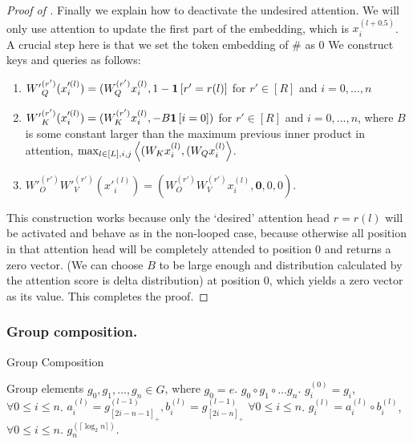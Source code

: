 \begin{proof}[Proof of ]
Finally we explain how to deactivate the undesired attention. We will only use attention to update the first part of the embedding, which is $x^{(l+0.5)}_i$. A crucial step here is that we set the token embedding of $\#$ as $0$
We construct keys and queries as follows: 
\begin{enumerate}
    \item ${W'}_Q^{(r')}(x'^{(l)}_{i}) = (W_Q^{(r')}x^{(l)}_{i}, 1- \bm{1}\left[r'=r(l)\right] $ for $r' \in [R]$ and $i=0,\ldots,n$
    \item ${W'}_K^{(r')}(x'^{(l)}_{i}) = (W_K^{(r')}x^{(l)}_{i}, -B\bm{1}\left[i=0\right]) $ for $r' \in [R]$ and $i=0,\ldots,n$, where $B$ is some constant larger than the maximum previous inner product in attention, $\max_{l\in[L],i,j} \left\langle (W_K x^{(l)}_{i},(W_Qx^{(l)}_{i} \right\rangle$. 
    \item ${W'}_O^{(r')}{W'}_V^{(r')}(x'^{(l)}_{i}) = (W_O^{(r')}W_V^{(r')}x^{(l)}_{i}, \bm{0}, 0,0)$.
\end{enumerate}
This construction works because only the `desired' attention head $r=r(l)$ will be activated and behave as in the non-looped case, because otherwise all position in that attention head will be completely attended to position $0$ and returns a zero vector. (We can choose $B$ to be large enough and distribution calculated by the attention score is delta distribution) at position $0$, which yields a zero vector as its value. This completes the proof.
\end{proof}





\subsubsection{Group composition.}
\label{sec:apx_group_composition}






\begin{algorithm}[t]
\caption{Group Composition}\label{alg:group_composition}
\begin{algorithmic}[1]
\Require  Group elements $g_0,g_1,\ldots,g_n\in G$, where $g_0=e$.
\Ensure $g_0\circ g_1\circ \ldots g_n$.
\State $g^{(0)}_i = g_i$, $\forall0\le i\le n$.
\State $a^{(l)}_i = g^{(l-1)}_{[2i-n-1]_+},b^{(l)}_i = g^{(l-1)}_{[2i-n]_+}$  $\forall0\le i\le n$.
\State $g^{(l)}_i = a^{(l)}_i\circ b^{(l)}_i$, $\forall0\le i\le n$.
\EndFor
\State \Return $g^{(\lceil\log _2 n\rceil)}_{n}$.
\end{algorithmic}
\end{algorithm}




